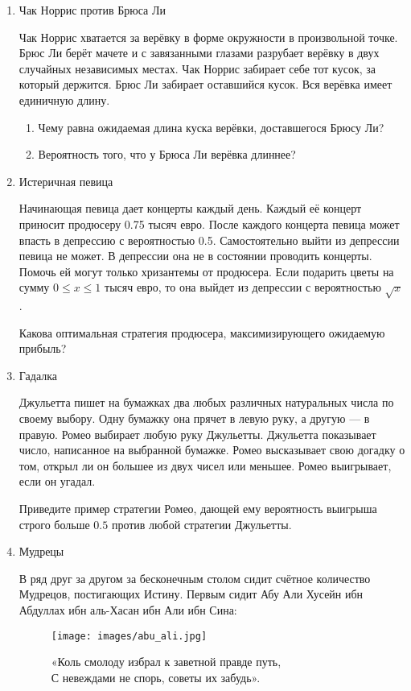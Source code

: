 \begin{enumerate}

\item Чак Норрис против Брюса Ли

Чак Норрис хватается за верёвку в форме окружности в произвольной точке. Брюс Ли берёт мачете и с завязанными глазами разрубает верёвку в двух случайных независимых местах. Чак Норрис забирает себе тот кусок, за который держится. Брюс Ли забирает оставшийся кусок.  Вся верёвка имеет единичную длину.
\begin{enumerate}
\item Чему равна ожидаемая длина куска верёвки, доставшегося Брюсу Ли?
\item  Вероятность того, что у Брюса Ли верёвка длиннее?
\end{enumerate}

\item Истеричная певица

Начинающая певица дает концерты каждый день. Каждый её концерт приносит продюсеру 0.75 тысяч евро. После каждого концерта певица может впасть в депрессию с вероятностью 0.5. Самостоятельно выйти из депрессии певица не может. В депрессии она не в состоянии проводить концерты. Помочь ей могут только хризантемы от продюсера. Если подарить цветы на сумму $0\le x\le 1$ тысяч евро, то она выйдет из депрессии с вероятностью $\sqrt{x}$.

Какова оптимальная стратегия продюсера, максимизирующего ожидаемую прибыль?

\item Гадалка

Джульетта пишет на бумажках два любых различных натуральных числа по своему выбору. Одну бумажку она прячет в левую руку, а другую — в правую. Ромео выбирает любую руку Джульетты. Джульетта показывает число, написанное на выбранной бумажке. Ромео высказывает свою догадку о том, открыл ли он большее из двух чисел или меньшее. Ромео выигрывает, если он угадал.

Приведите пример стратегии Ромео, дающей ему вероятность выигрыша строго больше $0.5$ против любой стратегии Джульетты.

\item Мудрецы

В ряд друг за другом за бесконечным столом сидит счётное количество Мудрецов, постигающих Истину. Первым сидит Абу Али Хусейн ибн Абдуллах ибн аль-Хасан ибн Али ибн Сина:

\begin{figure}[h!]
  \begin{center}
\texttt{[image: images/abu\_ali.jpg]}
  \caption*{«Коль смолоду избрал к заветной правде путь, \\
 С невеждами не спорь, советы их забудь». }
 \end{center}
\end{figure}



\end{enumerate}

